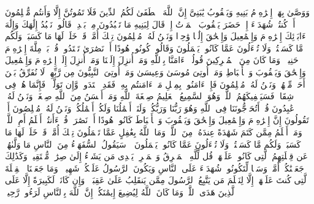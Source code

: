 \stopbuffer
\startbuffer[\q:2:132]
وَوَصَّىٰ بِهَاۤ إِبۡرَٰهِۦمُ بَنِیهِ وَیَعۡقُوبُ یَٰبَنِیَّ إِنَّ ٱللَّهَ ٱصۡطَفَىٰ لَكُمُ ٱلدِّینَ فَلَا تَمُوتُنَّ إِلَّا وَأَنتُم مُّسۡلِمُونَ%
\stopbuffer
\startbuffer[\q:2:133]
أَمۡ كُنتُمۡ شُهَدَاۤءَ إِذۡ حَضَرَ یَعۡقُوبَ ٱلۡمَوۡتُ إِذۡ قَالَ لِبَنِیهِ مَا تَعۡبُدُونَ مِنۢ بَعۡدِیۖ قَالُوا۟ نَعۡبُدُ إِلَٰهَكَ وَإِلَٰهَ ءَابَاۤئِكَ إِبۡرَٰهِۦمَ وَإِسۡمَٰعِیلَ وَإِسۡحَٰقَ إِلَٰهࣰا وَٰحِدࣰا وَنَحۡنُ لَهُۥ مُسۡلِمُونَ%
\stopbuffer
\startbuffer[\q:2:134]
تِلۡكَ أُمَّةࣱ قَدۡ خَلَتۡۖ لَهَا مَا كَسَبَتۡ وَلَكُم مَّا كَسَبۡتُمۡۖ وَلَا تُسۡءَلُونَ عَمَّا كَانُوا۟ یَعۡمَلُونَ%
\stopbuffer
\startbuffer[\q:2:135]
وَقَالُوا۟ كُونُوا۟ هُودًا أَوۡ نَصَٰرَىٰ تَهۡتَدُوا۟ۗ قُلۡ بَلۡ مِلَّةَ إِبۡرَٰهِۦمَ حَنِیفࣰاۖ وَمَا كَانَ مِنَ ٱلۡمُشۡرِكِینَ%
\stopbuffer
\startbuffer[\q:2:136]
قُولُوۤا۟ ءَامَنَّا بِٱللَّهِ وَمَاۤ أُنزِلَ إِلَیۡنَا وَمَاۤ أُنزِلَ إِلَىٰۤ إِبۡرَٰهِۦمَ وَإِسۡمَٰعِیلَ وَإِسۡحَٰقَ وَیَعۡقُوبَ وَٱلۡأَسۡبَاطِ وَمَاۤ أُوتِیَ مُوسَىٰ وَعِیسَىٰ وَمَاۤ أُوتِیَ ٱلنَّبِیُّونَ مِن رَّبِّهِمۡ لَا نُفَرِّقُ بَیۡنَ أَحَدࣲ مِّنۡهُمۡ وَنَحۡنُ لَهُۥ مُسۡلِمُونَ%
\stopbuffer
\startbuffer[\q:2:137]
فَإِنۡ ءَامَنُوا۟ بِمِثۡلِ مَاۤ ءَامَنتُم بِهِۦ فَقَدِ ٱهۡتَدَوا۟ۖ وَّإِن تَوَلَّوۡا۟ فَإِنَّمَا هُمۡ فِی شِقَاقࣲۖ فَسَیَكۡفِیكَهُمُ ٱللَّهُۚ وَهُوَ ٱلسَّمِیعُ ٱلۡعَلِیمُ%
\stopbuffer
\startbuffer[\q:2:138]
صِبۡغَةَ ٱللَّهِ وَمَنۡ أَحۡسَنُ مِنَ ٱللَّهِ صِبۡغَةࣰۖ وَنَحۡنُ لَهُۥ عَٰبِدُونَ%
\stopbuffer
\startbuffer[\q:2:139]
قُلۡ أَتُحَاۤجُّونَنَا فِی ٱللَّهِ وَهُوَ رَبُّنَا وَرَبُّكُمۡ وَلَنَاۤ أَعۡمَٰلُنَا وَلَكُمۡ أَعۡمَٰلُكُمۡ وَنَحۡنُ لَهُۥ مُخۡلِصُونَ%
\stopbuffer
\startbuffer[\q:2:140]
أَمۡ تَقُولُونَ إِنَّ إِبۡرَٰهِۦمَ وَإِسۡمَٰعِیلَ وَإِسۡحَٰقَ وَیَعۡقُوبَ وَٱلۡأَسۡبَاطَ كَانُوا۟ هُودًا أَوۡ نَصَٰرَىٰۗ قُلۡ ءَأَنتُمۡ أَعۡلَمُ أَمِ ٱللَّهُۗ وَمَنۡ أَظۡلَمُ مِمَّن كَتَمَ شَهَٰدَةً عِندَهُۥ مِنَ ٱللَّهِۗ وَمَا ٱللَّهُ بِغَٰفِلٍ عَمَّا تَعۡمَلُونَ%
\stopbuffer
\startbuffer[\q:2:141]
تِلۡكَ أُمَّةࣱ قَدۡ خَلَتۡۖ لَهَا مَا كَسَبَتۡ وَلَكُم مَّا كَسَبۡتُمۡۖ وَلَا تُسۡءَلُونَ عَمَّا كَانُوا۟ یَعۡمَلُونَ%
\stopbuffer
\startbuffer[\q:2:142]
۞ سَیَقُولُ ٱلسُّفَهَاۤءُ مِنَ ٱلنَّاسِ مَا وَلَّىٰهُمۡ عَن قِبۡلَتِهِمُ ٱلَّتِی كَانُوا۟ عَلَیۡهَاۚ قُل لِّلَّهِ ٱلۡمَشۡرِقُ وَٱلۡمَغۡرِبُۚ یَهۡدِی مَن یَشَاۤءُ إِلَىٰ صِرَٰطࣲ مُّسۡتَقِیمࣲ%
\stopbuffer
\startbuffer[\q:2:143]
وَكَذَٰلِكَ جَعَلۡنَٰكُمۡ أُمَّةࣰ وَسَطࣰا لِّتَكُونُوا۟ شُهَدَاۤءَ عَلَى ٱلنَّاسِ وَیَكُونَ ٱلرَّسُولُ عَلَیۡكُمۡ شَهِیدࣰاۗ وَمَا جَعَلۡنَا ٱلۡقِبۡلَةَ ٱلَّتِی كُنتَ عَلَیۡهَاۤ إِلَّا لِنَعۡلَمَ مَن یَتَّبِعُ ٱلرَّسُولَ مِمَّن یَنقَلِبُ عَلَىٰ عَقِبَیۡهِۚ وَإِن كَانَتۡ لَكَبِیرَةً إِلَّا عَلَى ٱلَّذِینَ هَدَى ٱللَّهُۗ وَمَا كَانَ ٱللَّهُ لِیُضِیعَ إِیمَٰنَكُمۡۚ إِنَّ ٱللَّهَ بِٱلنَّاسِ لَرَءُوفࣱ رَّحِیمࣱ%
\stopbuffer
